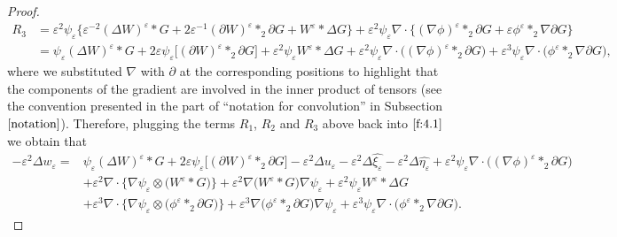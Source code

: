 \documentclass[13pt,CJK]{article}
\theoremstyle{plain}                       %
\theoremstyle{remark}
\numberwithin{equation}{section}
\begin{document}
\begin{proof}
\begin{equation*}
\begin{aligned}
R_3 &= \varepsilon^2\psi_{\varepsilon}
\bigg\{
\varepsilon^{-2}(\Delta W)^{\varepsilon}\ast G
+2\varepsilon^{-1}(\partial W)^{\varepsilon}\ast_2\partial G+W^{\varepsilon}\ast\Delta G
\bigg\}
+\varepsilon^{2}\psi_{\varepsilon}\nabla\cdot
\bigg\{
(\nabla\phi)^{\varepsilon}\ast_2\partial G
+\varepsilon\phi^{\varepsilon}\ast_{2}\nabla\partial G
\bigg\}\\
&= \psi_{\varepsilon}(\Delta W)^{\varepsilon}\ast G
+2\varepsilon\psi_{\varepsilon}
\big[(\partial W)^{\varepsilon}\ast_2\partial G\big]
+\varepsilon^2\psi_{\varepsilon}
W^{\varepsilon}\ast\Delta G
+\varepsilon^2\psi_{\varepsilon}
\nabla\cdot\Big(
(\nabla\phi)^{\varepsilon}\ast_2\partial G
\Big)
+\varepsilon^3\psi_{\varepsilon}\nabla\cdot
\Big(\phi^{\varepsilon}\ast_2\nabla\partial G\Big),
\end{aligned}
\end{equation*}
where we substituted $\nabla$ with $\partial$ at the corresponding positions to highlight
that the components of the gradient are involved in the inner product of tensors
(see the convention presented in the part of ``notation for convolution'' in Subsection $\ref{notation}$).
Therefore, plugging the terms $R_1$, $R_2$ and $R_3$ above back into
$\eqref{f:4.1}$ we obtain that
\begin{equation}\label{f:4.3}
\begin{aligned}
-\varepsilon^2\Delta w_{\varepsilon}
=&\psi_{\varepsilon}(\Delta W)^{\varepsilon}\ast G
+2\varepsilon\psi_{\varepsilon}
\big[(\partial W)^{\varepsilon}\ast_2\partial G\big]
-\varepsilon^2\Delta u_{\varepsilon}
-\varepsilon^2\Delta\hat{\xi_{\varepsilon}}
-\varepsilon^2\Delta\hat{\eta_{\varepsilon}}
+\varepsilon^2\psi_{\varepsilon}
\nabla\cdot\Big(
(\nabla\phi)^{\varepsilon}\ast_2\partial G
\Big)\\
&+\varepsilon^2\nabla\cdot\bigg\{
\nabla\psi_{\varepsilon}\otimes \big(W^{\varepsilon}\ast G\big)
\bigg\}
+\varepsilon^2\nabla
\big(W^{\varepsilon}\ast G\big)\nabla\psi_{\varepsilon}
+\varepsilon^2\psi_{\varepsilon}
W^{\varepsilon}\ast\Delta G\\
&+\varepsilon^{3}\nabla\cdot
\bigg\{
\nabla\psi_{\varepsilon}\otimes
\big(\phi^{\varepsilon}\ast_2\partial G\big)
\bigg\}
+\varepsilon^3
\nabla\big(\phi^{\varepsilon}\ast_2\partial G\big)\nabla\psi_{\varepsilon}
+\varepsilon^3\psi_{\varepsilon}\nabla\cdot
\Big(\phi^{\varepsilon}\ast_2\nabla\partial G\Big).
\end{aligned}
\end{equation}

\medskip


\end{proof}
\end{document}
